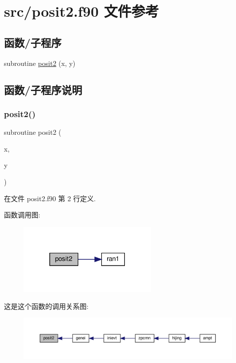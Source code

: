 \hypertarget{posit2_8f90}{}\section{src/posit2.f90 文件参考}
\label{posit2_8f90}
\subsection*{函数/子程序}
\begin{DoxyCompactItemize}
\item 
subroutine \mbox{\hyperlink{posit2_8f90_a4a1a05e2249ea6d3612b5934ddadbb13}{posit2}} (x, y)
\end{DoxyCompactItemize}


\subsection{函数/子程序说明}
\mbox{\label{posit2_8f90_a4a1a05e2249ea6d3612b5934ddadbb13}} 
\subsubsection{\texorpdfstring{posit2()}{posit2()}}
{\footnotesize\ttfamily subroutine posit2 (\begin{DoxyParamCaption}\item[{}]{x,  }\item[{}]{y }\end{DoxyParamCaption})}



在文件 posit2.\+f90 第 2 行定义.

函数调用图\+:
\nopagebreak
\begin{figure}[H]
\begin{center}
\leavevmode
\includegraphics[width=194pt]{posit2_8f90_a4a1a05e2249ea6d3612b5934ddadbb13_cgraph}
\end{center}
\end{figure}
这是这个函数的调用关系图\+:
\nopagebreak
\begin{figure}[H]
\begin{center}
\leavevmode
\includegraphics[width=350pt]{posit2_8f90_a4a1a05e2249ea6d3612b5934ddadbb13_icgraph}
\end{center}
\end{figure}
